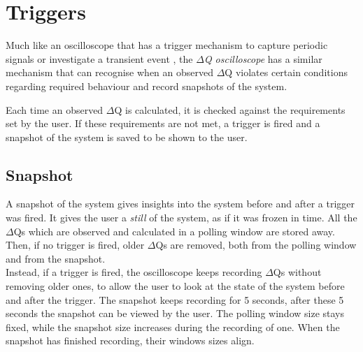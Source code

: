 \section{Triggers}
    Much like an oscilloscope that has a trigger mechanism to capture periodic signals or investigate a transient event \cite{osc-t}, the \textit{$\Delta$Q oscilloscope} has a similar mechanism that can recognise when an observed $\Delta$Q violates certain conditions regarding required behaviour and record snapshots of the system.

    Each time an observed $\Delta$Q is calculated, it is checked against the requirements set by the user. If these requirements are not met, a trigger is fired and a snapshot of the system is saved to be shown to the user. 
    
    \subsection{Snapshot}
    A snapshot of the system gives insights into the system before and after a trigger was fired. It gives the user a \textit{still} of the system, as if it was frozen in time. All the $\Delta$Qs which are observed and calculated in a polling window are stored away. Then, if no trigger is fired, older $\Delta$Qs are removed, both from the polling window and from the snapshot. \\
    Instead, if a trigger is fired, the oscilloscope keeps recording $\Delta$Qs without removing older ones, to allow the user to look at the state of the system before and after the trigger. The snapshot keeps recording for 5 seconds, after these 5 seconds the snapshot can be viewed by the user. The polling window size stays fixed, while the snapshot size increases during the recording of one. When the snapshot has finished recording, their windows sizes align.
    
